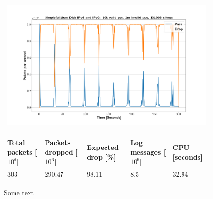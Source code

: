 \begin{figure}[p]
	\label{fig:simplefail2ban:disk:ip46:1m}
	\centering
	\scriptsize
	\begin{tabular}{c}
    	\centerline{\includegraphics[width=1.2\textwidth]{images/simplefail2ban_disk_ipv46_v10k_iv1m_c131068.png}}
	\end{tabular}
	\begin{tabular}{lllll}
		\toprule
		\textbf{Total packets [$10^6$]} & \textbf{Packets dropped [$10^6$]} & \textbf{Expected drop [\%]} & \textbf{Log messages [$10^6$]} & \textbf{CPU [seconds]} \\ \midrule 
		303 & 290.47 & 98.11 & 8.5 & 32.94 \\
	\bottomrule
	\end{tabular}
	\caption[Simplefail2ban Logfile IPv4 \& IPv6 1m PPS]{Some text}
\end{figure}

